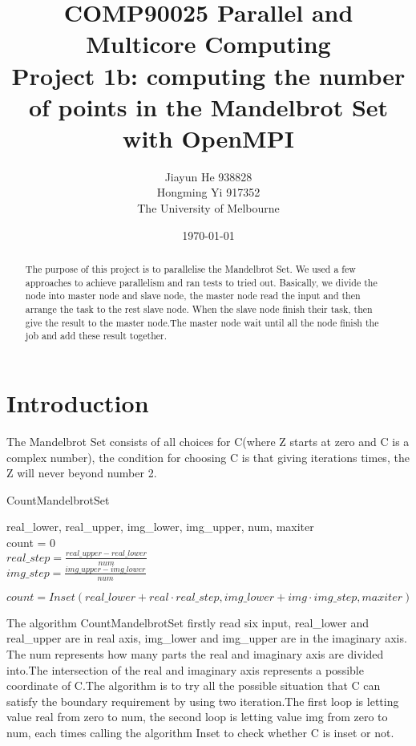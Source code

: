 \documentclass[a4paper]{article}
\title{COMP90025 Parallel and Multicore Computing \\Project 1b: computing the number of points in the Mandelbrot Set with OpenMPI}
\author{Jiayun He 938828\\Hongming Yi 917352\\The University of Melbourne}
\date{\today}
\begin{document}
\maketitle

\begin{abstract}
The purpose of this project is to parallelise the Mandelbrot Set. We used a few approaches to achieve parallelism and ran tests to tried out. Basically, we divide the node into master node and slave node, the master node read the input and then arrange the task to the rest slave node. When the slave node finish their task, then give the result to the master node.The master node wait until all the node finish the job and add these result together.\end{abstract}

\section{Introduction}
\label{sec:introduction}

The Mandelbrot Set consists of all choices for C(where Z starts at zero and C is a complex number), the condition for choosing C is that giving iterations times,  the Z will never beyond number 2.

\begin{algorithm}
\caption{CountMandelbrotSet}
\begin{algorithmic}
\REQUIRE real\_lower, real\_upper, img\_lower, img\_upper, num, maxiter
\\ count = 0
\\ $real\_step = \frac{real\_upper-real\_lower}{num}$
\\ $img\_step = \frac{img\_upper-img\_lower}{num}$

\STATE $count=Inset(real\_lower+ real\cdot real\_step,  img\_lower+ img\cdot img\_step, maxiter)$

\ENDFOR
\ENDFOR

\end{algorithmic}
\end{algorithm}

The algorithm CountMandelbrotSet firstly read six input, real\_lower and real\_upper are in real axis, img\_lower and img\_upper are in the imaginary axis. The num represents how many parts the real and imaginary axis are divided into.The intersection of the real and imaginary axis represents a possible coordinate of C.The algorithm is to try all the possible situation that C can satisfy the boundary requirement by using two iteration.The first loop is letting value real from zero to num, the second loop is letting value img from zero to num, each times calling the algorithm Inset to check whether C is inset or not. 
\end{document}
